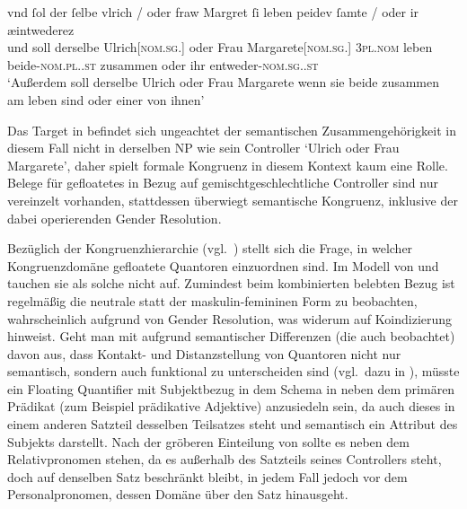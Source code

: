 \begin{exe}
\ex \label{ex:m+f_si_beidiu_float}
	\gll vnd ſol {der ſelbe} vlrich / oder fraw Margret \textelp{}
			ſi leben peidev ſamte / oder ir æintwederez \\
		und soll derselbe Ulrich[\textsc{nom.sg.\MascM}] {} oder Frau
			Margarete[\textsc{nom.sg.\FemF}] {} \textsc{3pl\subMF.nom} leben
			beide-\textsc{nom.pl.\NeutMF.st} zusammen {} oder ihr
			entweder-\textsc{nom.sg.\NeutMF.st} \\
	\trans `Außerdem soll derselbe Ulrich oder Frau Margarete \textelp{}
		wenn sie beide zusammen am leben sind oder einer von ihnen'
		\parencites(Nr.~3141~A, Brixen, 1298)[352,3--9]{cao4}
\end{exe}

Das Target  in  befindet sich
ungeachtet der semantischen Zusammengehörigkeit in diesem Fall nicht in
derselben NP wie sein Controller  `Ulrich oder
Frau Margarete', daher spielt formale Kongruenz in diesem Kontext kaum eine
Rolle. Belege für gefloatetes  in Bezug auf gemischtgeschlechtliche
Controller sind nur vereinzelt vorhanden, stattdessen überwiegt semantische
Kongruenz, inklusive der dabei operierenden Gender Resolution.

Bezüglich der Kongruenzhierarchie (vgl.~) stellt sich die
Frage, in welcher Kongruenzdomäne gefloatete Quantoren einzuordnen sind. Im
Modell von \citet{corbett1979} und \citet[84]{wechslerzlatic2003} tauchen sie
als solche nicht auf. Zumindest beim kombinierten belebten Bezug ist regelmäßig
die neutrale statt der maskulin-femininen Form zu beobachten, wahrscheinlich
aufgrund von Gender Resolution, was widerum auf Koindizierung hinweist. Geht
man mit \citet{spector2009} aufgrund semantischer Differenzen (die auch
\cite{pittner1995} beobachtet) davon aus, dass Kontakt- und Distanzstellung von
Quantoren nicht nur semantisch, sondern auch funktional zu unterscheiden sind
(vgl.~dazu in ), müsste ein Floating Quantifier mit
Subjektbezug in dem Schema in  neben dem primären
Prädikat (zum Beispiel prädikative Adjektive) anzusiedeln sein, da auch dieses
in einem anderen Satzteil desselben Teilsatzes steht und semantisch ein
Attribut des Subjekts darstellt. Nach der gröberen Einteilung von
\citet[216]{corbett1979} sollte es neben dem Relativpronomen stehen, da es
außerhalb des Satzteils seines Controllers steht, doch auf denselben Satz
beschränkt bleibt, in jedem Fall jedoch vor dem Personalpronomen, dessen Domäne
über den Satz hinausgeht.%

